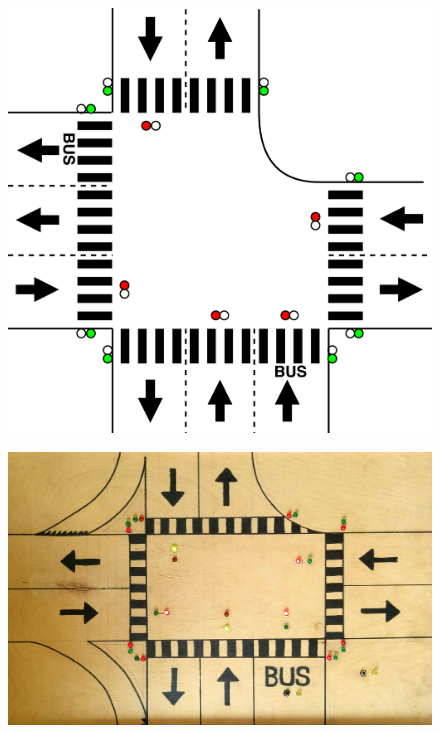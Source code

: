 \begin{figure}[H]
\centering
\begin{minipage}{.5\textwidth}
  \centering
  \includegraphics[width=.8\linewidth]{../common/images/crossroad.png}
  \label{fig:test1}
\end{minipage}%
\begin{minipage}{.5\textwidth}
  \centering
  \includegraphics[width=.9\linewidth]{../common/images/wood-crossroad.jpg}
  \label{fig:test2}
\end{minipage}
\end{figure}


